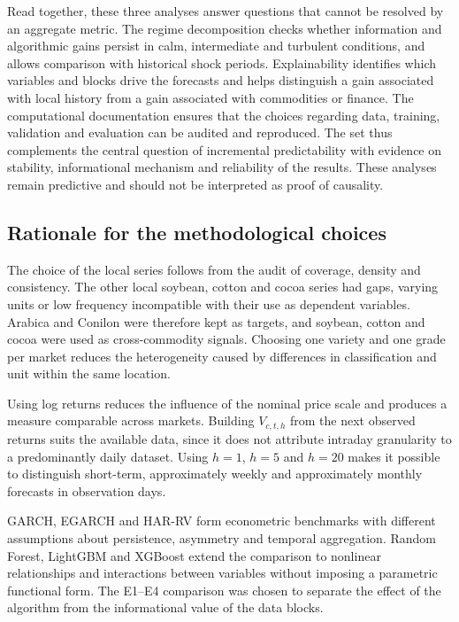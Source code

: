 \documentclass[a4paper,fleqn]{cas-sc}
\begin{document}
Read together, these three analyses answer questions that cannot be resolved by an aggregate metric. The regime decomposition checks whether information and algorithmic gains persist in calm, intermediate and turbulent conditions, and allows comparison with historical shock periods. Explainability identifies which variables and blocks drive the forecasts and helps distinguish a gain associated with local history from a gain associated with commodities or finance. The computational documentation ensures that the choices regarding data, training, validation and evaluation can be audited and reproduced. The set thus complements the central question of incremental predictability with evidence on stability, informational mechanism and reliability of the results. These analyses remain predictive and should not be interpreted as proof of causality.

\subsection{Rationale for the methodological choices}
\label{subsec:methodological_rationale}

The choice of the local series follows from the audit of coverage, density and consistency. The other local soybean, cotton and cocoa series had gaps, varying units or low frequency incompatible with their use as dependent variables. Arabica and Conilon were therefore kept as targets, and soybean, cotton and cocoa were used as cross-commodity signals. Choosing one variety and one grade per market reduces the heterogeneity caused by differences in classification and unit within the same location.

Using log returns reduces the influence of the nominal price scale and produces a measure comparable across markets. Building \(V_{c,t,h}\) from the next observed returns suits the available data, since it does not attribute intraday granularity to a predominantly daily dataset. Using \(h=1\), \(h=5\) and \(h=20\) makes it possible to distinguish short-term, approximately weekly and approximately monthly forecasts in observation days.

GARCH, EGARCH and HAR-RV form econometric benchmarks with different assumptions about persistence, asymmetry and temporal aggregation. Random Forest, LightGBM and XGBoost extend the comparison to nonlinear relationships and interactions between variables without imposing a parametric functional form. The E1--E4 comparison was chosen to separate the effect of the algorithm from the informational value of the data blocks.
\end{document}
